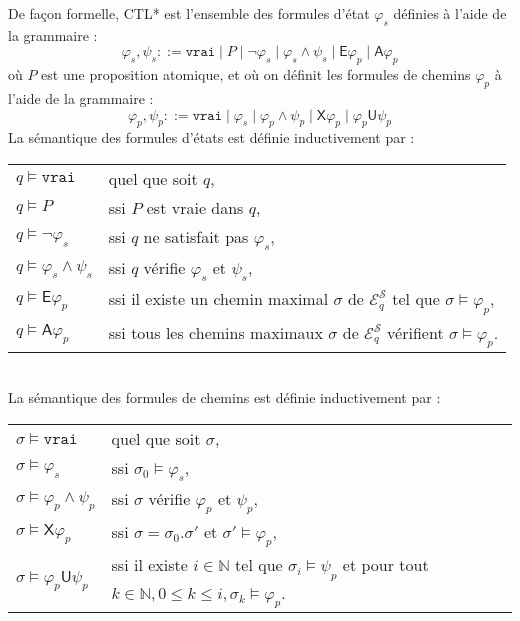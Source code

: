 De façon formelle, CTL* est l'ensemble des formules d'état $\varphi_s$ définies à l'aide de la grammaire :
  $$\varphi_s, \psi_s ::= \texttt{vrai} \mid P \mid \neg \varphi_s \mid \varphi_s \wedge \psi_s \mid \textsf{E} \varphi_p \mid \textsf{A} \varphi_p$$
où $P$ est une proposition atomique, et où on définit les formules de chemins $\varphi_p$ à l'aide de la grammaire :
  $$\varphi_p, \psi_p ::= \texttt{vrai} \mid \varphi_s \mid \varphi_p \wedge \psi_p \mid \textsf{X} \varphi_p \mid \varphi_p \textsf{U} \psi_p$$
La sémantique des formules d'états est définie inductivement par :\\
\begin{tabular}{ll}%
  $q \models \texttt{vrai}$ & quel que soit $q$,\\
  $q \models P$ & ssi $P$ est vraie dans $q$,\\
  $q \models \neg \varphi_s$ & ssi $q$ ne satisfait pas $\varphi_s$,\\
  $q \models \varphi_s \wedge \psi_s$ & ssi $q$ vérifie $\varphi_s$ et $\psi_s$,\\
  $q \models \mathsf{E} \varphi_p$ & ssi il existe un chemin maximal $\sigma$ de $\mathcal{E}^\mathcal{S}_q$ tel que $\sigma \models \varphi_p$,\\
  $q \models \mathsf{A} \varphi_p$ & ssi tous les chemins maximaux $\sigma$ de $\mathcal{E}^\mathcal{S}_q$ vérifient $\sigma \models \varphi_p$.\\
\end{tabular}\\
La sémantique des formules de chemins est définie inductivement par :\\
\begin{tabular}{ll}%
  $\sigma \models \texttt{vrai}$ & quel que soit $\sigma$,\\
  $\sigma \models \varphi_s$ & ssi $\sigma_0 \models \varphi_s$,\\
  $\sigma \models \varphi_p \wedge \psi_p$ & ssi $\sigma$ vérifie $\varphi_p$ et $\psi_p$,\\
  $\sigma \models \mathsf{X} \varphi_p$ & ssi $\sigma = \sigma_0.\sigma'$ et $\sigma' \models \varphi_p$,\\
  $\sigma \models \varphi_p \mathsf{U} \psi_p$ & ssi il existe $i \in \mathbb{N}$ tel que $\sigma_i \models \psi_p$ et pour tout $k \in \mathbb{N}, 0 \leq k \leq i, \sigma_k \models \varphi_p$.
\end{tabular}\\

